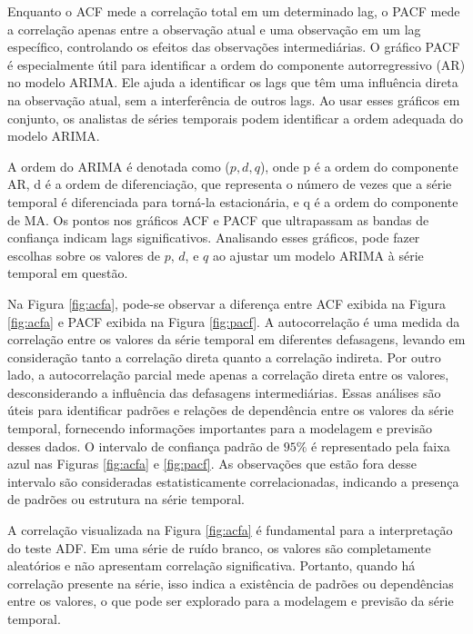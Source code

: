Enquanto o ACF mede a correlação total em um determinado lag, o PACF mede a correlação apenas entre a observação atual e uma observação em um lag específico, controlando os efeitos das observações intermediárias. O gráfico PACF é especialmente útil para identificar a ordem do componente autorregressivo (AR) no modelo ARIMA. Ele ajuda a identificar os lags que têm uma influência direta na observação atual, sem a interferência de outros lags. Ao usar esses gráficos em conjunto, os analistas de séries temporais podem identificar a ordem adequada do modelo ARIMA. 

A ordem do ARIMA é denotada como ($p, d, q$), onde p é a ordem do componente AR, d é a ordem de diferenciação, que representa o número de vezes que a série temporal é diferenciada para torná-la estacionária, e q é a ordem do componente de MA. Os pontos nos gráficos ACF e PACF que ultrapassam as bandas de confiança indicam lags significativos. Analisando esses gráficos, pode fazer escolhas sobre os valores de $p$, $d$, e $q$ ao ajustar um modelo ARIMA à série temporal em questão. 

Na Figura \ref{fig:acfa}, pode-se observar a diferença entre ACF exibida na Figura \ref{fig:acfa} e PACF exibida na Figura \ref{fig:pacf}. A autocorrelação é uma medida da correlação entre os valores da série temporal em diferentes defasagens, levando em consideração tanto a correlação direta quanto a correlação indireta. Por outro lado, a autocorrelação parcial mede apenas a correlação direta entre os valores, desconsiderando a influência das defasagens intermediárias. Essas análises são úteis para identificar padrões e relações de dependência entre os valores da série temporal, fornecendo informações importantes para a modelagem e previsão desses dados. O intervalo de confiança padrão de $95\%$ é representado pela faixa azul nas Figuras \ref{fig:acfa} e \ref{fig:pacf}. As observações que estão fora desse intervalo são consideradas estatisticamente correlacionadas, indicando a presença de padrões ou estrutura na série temporal.

A correlação visualizada na Figura \ref{fig:acfa} é fundamental para a interpretação do teste ADF. Em uma série de ruído branco, os valores são completamente aleatórios e não apresentam correlação significativa. Portanto, quando há correlação presente na série, isso indica a existência de padrões ou dependências entre os valores, o que pode ser explorado para a modelagem e previsão da série temporal.

